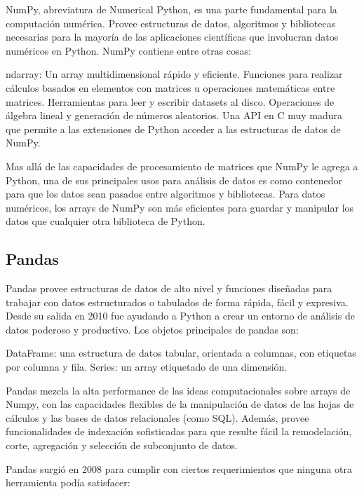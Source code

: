 NumPy, abreviatura de Numerical Python, es una parte fundamental para la computación numérica. Provee estructuras de datos, algoritmos y bibliotecas necesarias para la mayoría de las aplicaciones científicas que involucran datos numéricos en Python. NumPy contiene entre otras cosas:
\begin{outline}
    \1 ndarray: Un array multidimensional rápido y eficiente.
    \1 Funciones para realizar cálculos basados en elementos con matrices u operaciones matemáticas entre matrices.
    \1 Herramientas para leer y escribir datasets al disco.
    \1 Operaciones de álgebra lineal y generación de números aleatorios.
    \1 Una API en C muy madura que permite a las extensiones de Python acceder a las estructuras de datos de NumPy.
\end{outline}
Mas allá de las capacidades de procesamiento de matrices que NumPy le agrega a Python, una de sus principales usos para análisis de datos es como contenedor para que los datos sean pasados entre algoritmos y bibliotecas. Para datos numéricos, los arrays de NumPy son más eficientes para guardar y manipular los datos que cualquier otra biblioteca de Python.


\subsection[Pandas]{Pandas}

Pandas provee estructuras de datos de alto nivel y funciones diseñadas para trabajar con datos estructurados o tabulados de forma rápida, fácil y expresiva. Desde su salida en 2010 fue ayudando a Python a crear un entorno de análisis de datos poderoso y productivo. Los objetos principales de pandas son: 
\begin{outline}
    \1 DataFrame: una estructura de datos tabular, orientada a columnas, con etiquetas por columna y fila.
    \1 Series: un array etiquetado de una dimensión.
\end{outline}

Pandas mezcla la alta performance de las ideas computacionales sobre arrays de Numpy, con las capacidades flexibles de la manipulación de datos de las hojas de cálculos y las bases de datos relacionales (como SQL). Además, provee funcionalidades de indexación sofisticadas para que resulte fácil la remodelación, corte, agregación y selección de subconjunto de datos.

Pandas surgió en 2008 para cumplir con ciertos requerimientos que ninguna otra herramienta podía satisfacer:

